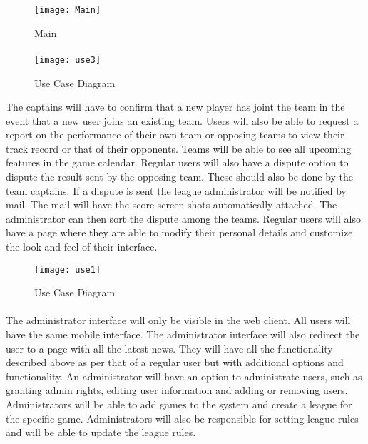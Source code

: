 \documentclass[11pt]{article}
\begin{document}
\begin{figure}[h]
\caption{Main}
\centering
\texttt{[image: Main]}
\end{figure}

\paragraph{}
\begin{figure}[t]
\caption{Use Case Diagram }
\centering
\hspace*{-2cm}\texttt{[image: use3]}
\end{figure}
The captains will have to confirm that a new player has joint the team in the event that a new user joins an existing team. Users will also be able to request a report on the performance of their own team or opposing teams to view their track record or that of their opponents. Teams will be able to see all upcoming features in the game calendar. Regular users will also have a dispute option to dispute the result sent by the opposing team. These should also be done by the team captains. If a dispute is sent the league administrator will be notified by mail. The mail will have the score screen shots automatically attached. The administrator can then sort the dispute among the teams. Regular users will also have a page where they are able to modify their personal details and customize the look and feel of their interface.	

\begin{figure}[h]
\caption{Use Case Diagram }
\centering
\hspace*{-2cm}\texttt{[image: use1]}
\end{figure}


\paragraph{}
The administrator interface will only be visible in the web client. All users will have the same mobile interface. The administrator interface will also redirect the user to a page with all the latest news. They will have all the functionality described above as per that of a regular user but with additional options and functionality.
An administrator will have an option to administrate users, such as granting admin rights, editing user information and adding or removing users. Administrators will be able to add games to the system and create a league for the specific game. Administrators will also be responsible for setting league rules and will be able to update the league rules.
\end{document}

